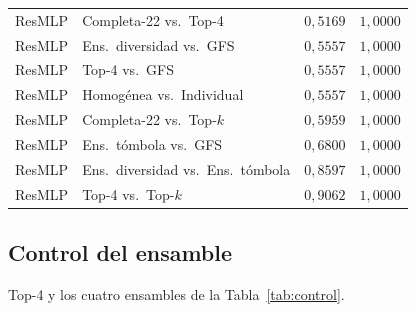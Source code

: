 \documentclass[11pt,a4paper]{article}
\begin{document}
\begin{table}[H]
\begin{tabular}{@{}llrr@{}}
ResMLP & Completa-22 vs.\ Top-4 & $0{,}5169$ & $1{,}0000$ \\
ResMLP & Ens.\ diversidad vs.\ GFS & $0{,}5557$ & $1{,}0000$ \\
ResMLP & Top-4 vs.\ GFS & $0{,}5557$ & $1{,}0000$ \\
ResMLP & Homogénea vs.\ Individual & $0{,}5557$ & $1{,}0000$ \\
ResMLP & Completa-22 vs.\ Top-$k$ & $0{,}5959$ & $1{,}0000$ \\
ResMLP & Ens.\ tómbola vs.\ GFS & $0{,}6800$ & $1{,}0000$ \\
ResMLP & Ens.\ diversidad vs.\ Ens.\ tómbola & $0{,}8597$ & $1{,}0000$ \\
ResMLP & Top-4 vs.\ Top-$k$ & $0{,}9062$ & $1{,}0000$ \\
\bottomrule
\end{tabular}
\end{table}

\subsection{Control del ensamble}

\noindent Top-4 y los cuatro ensambles de la Tabla~\ref{tab:control}.
\end{document}
